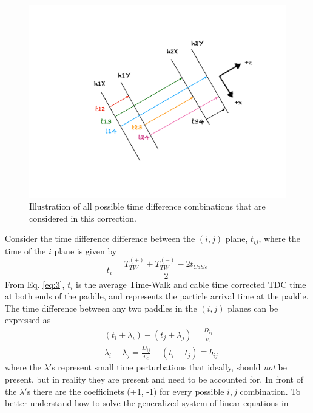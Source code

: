 \documentclass[14pt]{article}
\begin{document}
\begin{itemize}
\begin{figure}[H]
    \captionsetup{justification=raggedright,singlelinecheck=false}
    \includegraphics[scale=0.5]{hodo_planes.pdf}
    \caption{Illustration of all possible time difference combinations that are considered in this correction.}
    \label{fig:hod_planes}
\end{figure}
Consider the time difference difference between the $(i,j)$ plane, $t_{ij}$, where the time of the $i$ plane is
given by
\begin{equation}\label{eq:3}
  t_{i} = \frac{T^{(+)}_{TW} + T^{(-)}_{TW} - 2t_{Cable}}{2} 
\end{equation}
From Eq. \ref{eq:3}, $t_{i}$ is the average Time-Walk and cable time corrected TDC time at both ends of the paddle,
and represents the particle arrival time at the paddle. The time difference between any two paddles in the $(i,j)$
planes can be expressed as
\begin{equation} \label{eq:4}
\begin{split}
  &(t_{i} + \lambda_{i}) - (t_{j} + \lambda_{j}) = \frac{D_{ij}}{v_{c}} \\
  &\lambda_{i} - \lambda_{j} = \frac{D_{ij}}{v_{c}} - (t_{i} - t_{j}) \equiv b_{ij}
\end{split}
\end{equation}
where the $\lambda'$s represent small time perturbations that ideally, should \textit{not} be present, but in
reality they are present and need to be accounted for. In front of the $\lambda'$s there are the coefficinets (+1, -1) for
every possible $i,j$ combination. To better understand how to solve the generalized system of linear equations in

\end{itemize}
\end{document}
